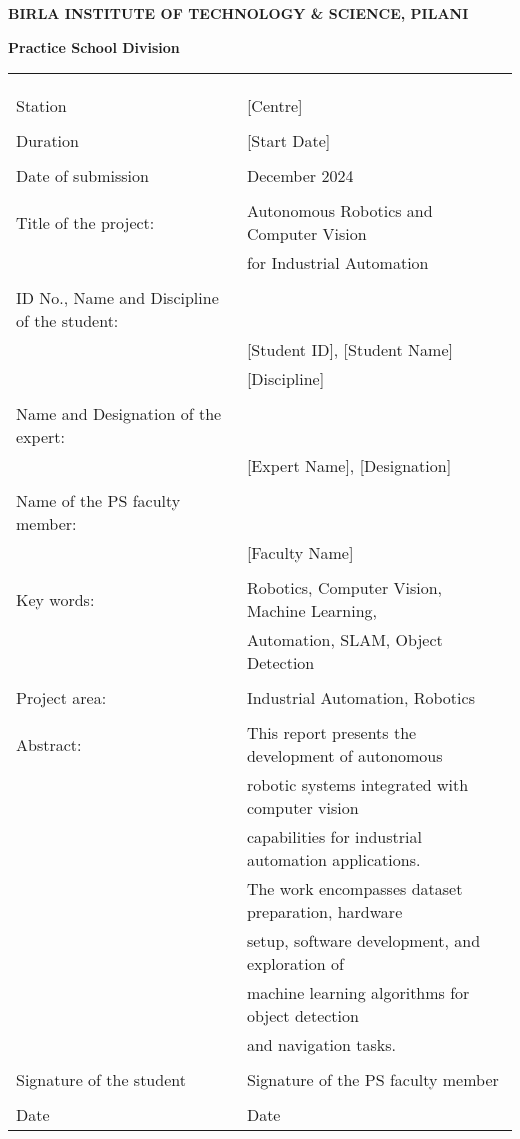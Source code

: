 \documentclass{book}
\begin{document}
	\centerline{\bf BIRLA INSTITUTE OF TECHNOLOGY \& SCIENCE, PILANI}
	\vspace*{0.2cm}
	\centerline{\bf Practice School Division}
	\vspace*{0.3cm}
	{\bf 
		\begin{tabular}{p{6cm}l}
			& \\
			& \\
			& \\
			Station & \hspace*{3cm} [Centre] \\
			& \\
			Duration &\hspace*{3cm} [Start Date] \\
			& \\
			Date of submission & December 2024 \\
			& \\
			Title of the project: & Autonomous Robotics and Computer Vision \\
			& for Industrial Automation \\
			& \\
			ID No., Name and Discipline of the student: & \\
			& [Student ID], [Student Name] \\
			& [Discipline] \\
			& \\
			Name and Designation of the expert: & \\
			& [Expert Name], [Designation] \\
			& \\
			Name of the PS faculty member: & \\
			& [Faculty Name] \\
			& \\
			Key words: & Robotics, Computer Vision, Machine Learning, \\
			& Automation, SLAM, Object Detection \\
			& \\
			Project area:  & Industrial Automation, Robotics \\
			& \\
			Abstract: & This report presents the development of autonomous \\
			& robotic systems integrated with computer vision \\
			& capabilities for industrial automation applications. \\
			& The work encompasses dataset preparation, hardware \\
			& setup, software development, and exploration of \\
			& machine learning algorithms for object detection \\
			& and navigation tasks. \\
			& \\
			Signature of the student & \hspace*{1cm}Signature of the PS faculty member \\
			& \\
			Date & \hspace*{1cm}Date \\
		\end{tabular}}
\end{document}

